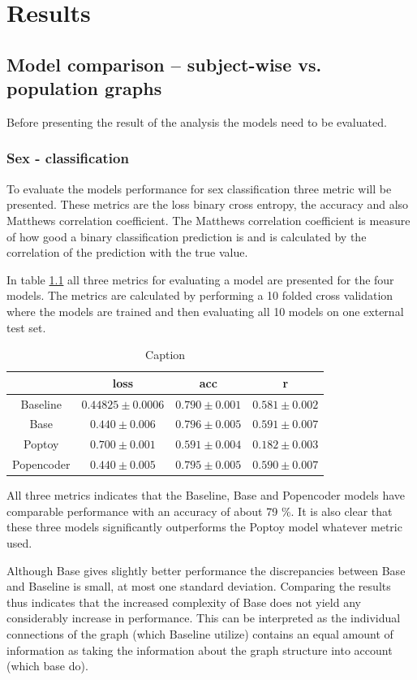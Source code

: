 \chapter{Results}

\section{Model comparison -- subject-wise vs. population graphs}
Before presenting the result of the analysis the models need to be evaluated. 

\subsection{Sex - classification}
To evaluate the models performance for sex classification three metric will be presented. These metrics are the loss binary cross entropy, the accuracy and also Matthews correlation coefficient. 
The Matthews correlation coefficient is measure of how good a binary classification prediction is and is calculated by the correlation of the prediction with the true value. 


In table \ref{tab:sex_model_results} all three metrics for evaluating a model are presented for the four models. The metrics are calculated by performing a 10 folded cross validation where the models are trained and then evaluating all 10 models on one external test set. 
\begin{table}[H]
    \centering
    \caption{Caption}
    \begin{tabular}{c|c|c|c}
         &  loss & acc & r\\ \hline
        Baseline & $0.44825\pm0.0006$&$0.790\pm0.001$ &$0.581\pm0.002$\\
        Base &$0.440\pm0.006$ & $0.796\pm0.005$ & $0.591\pm0.007$\\
        Poptoy &$0.700\pm 0.001$ & $0.591\pm0.004$ &$ 0.182\pm 0.003$\\
        Popencoder &$0.440\pm0.005$& $0.795\pm 0.005$ & $0.590\pm0.007$\\
    \end{tabular}
    \label{tab:sex_model_results}
\end{table}

All three metrics indicates that the Baseline, Base and Popencoder models have comparable performance with an accuracy of about 79 \%. It is also clear that these three models significantly outperforms the Poptoy model whatever metric used.

Although Base gives slightly better performance the discrepancies between Base and Baseline is small, at most one standard deviation. Comparing the results thus indicates that the increased complexity of Base does not yield any considerably increase in performance. This can be interpreted as the individual connections of the graph (which Baseline utilize) contains an equal amount of information as taking the information about the graph structure into account (which base do). 

